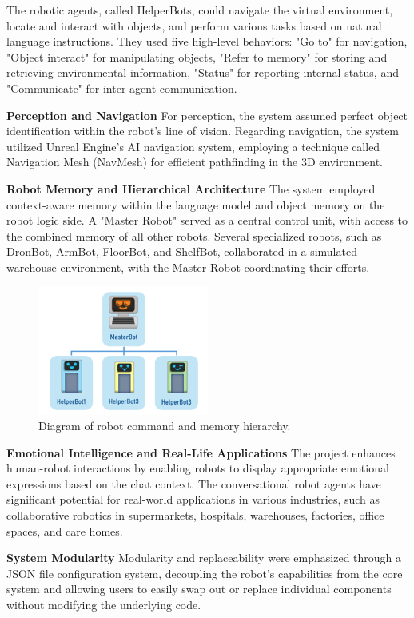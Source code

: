 \documentclass[pdflatex,sn-mathphys-num]{sn-jnl}%
\theoremstyle{thmstyleone}%
\theoremstyle{thmstyletwo}%
\theoremstyle{thmstylethree}%
\begin{document}
The robotic agents, called HelperBots, could navigate the virtual environment, locate and interact with objects, and perform various tasks based on natural language instructions. They used five high-level behaviors: "Go to" for navigation, "Object interact" for manipulating objects, "Refer to memory" for storing and retrieving environmental information, "Status" for reporting internal status, and "Communicate" for inter-agent communication.


\textbf{Perception and Navigation}
For perception, the system assumed perfect object identification within the robot's line of vision. Regarding navigation, the system utilized Unreal Engine's AI navigation system, employing a technique called Navigation Mesh (NavMesh) for efficient pathfinding in the 3D environment.

\textbf{Robot Memory and Hierarchical Architecture}
The system employed context-aware memory within the language model and object memory on the robot logic side. A "Master Robot" served as a central control unit, with access to the combined memory of all other robots. Several specialized robots, such as DronBot, ArmBot, FloorBot, and ShelfBot, collaborated in a simulated warehouse environment, with the Master Robot coordinating their efforts.
\begin{figure}[h]
\centering
\includegraphics[width=0.5\textwidth]{figures/Picture6.png}
\caption{Diagram of robot command and memory hierarchy.}\label{fig9}
\end{figure}

\textbf{Emotional Intelligence and Real-Life Applications
}The project enhances human-robot interactions by enabling robots to display appropriate emotional expressions based on the chat context. The conversational robot agents have significant potential for real-world applications in various industries, such as collaborative robotics in supermarkets, hospitals, warehouses, factories, office spaces, and care homes.

\textbf{System Modularity}
Modularity and replaceability were emphasized through a JSON file configuration system, decoupling the robot's capabilities from the core system and allowing users to easily swap out or replace individual components without modifying the underlying code.
\end{document}
